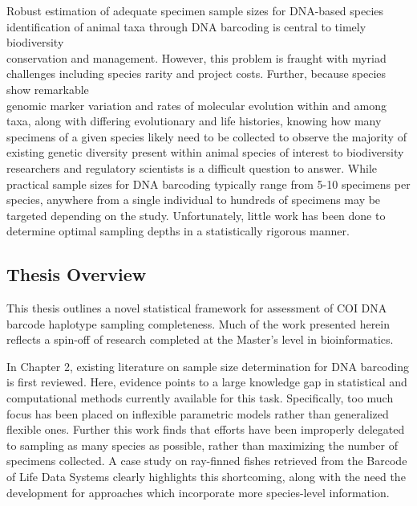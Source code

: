 \vspace{5mm}

Robust estimation of adequate specimen sample sizes for DNA-based species \\ identification of animal taxa through DNA barcoding is central to timely biodiversity \\ conservation and management. However, this problem is fraught with myriad challenges including species rarity and project costs. Further, because species show remarkable \\ genomic marker variation and rates of molecular evolution within and among taxa, along with differing evolutionary and life histories, knowing how many specimens of a given species likely need to be collected to observe the majority of existing genetic diversity present within animal species of interest to biodiversity researchers and regulatory scientists is a difficult question to answer. While practical sample sizes for DNA barcoding typically range from 5-10 specimens per species, anywhere from a single individual to hundreds of specimens may be targeted depending on the study. Unfortunately, little work has been done to determine optimal sampling depths in a statistically rigorous manner. 

\vspace{5mm}

\subsection{Thesis Overview} \label{sec:intro1}

This thesis outlines a novel statistical framework for assessment of COI DNA barcode haplotype sampling completeness. Much of the work presented herein reflects a spin-off of research completed at the Master's level in bioinformatics.

\vspace{5mm}

In Chapter 2, existing literature on sample size determination for DNA barcoding is first reviewed. Here, evidence points to a large knowledge gap in statistical and computational methods currently available for this task. Specifically, too much focus has been placed on inflexible parametric models rather than generalized flexible ones. Further this work finds that efforts have been improperly delegated to sampling as many species as possible, rather than maximizing the number of specimens collected. A case study on ray-finned fishes retrieved from the Barcode of Life Data Systems \cite{ratnasingham2007bold} clearly highlights this shortcoming, along with the need the development for approaches which incorporate more species-level information. 

